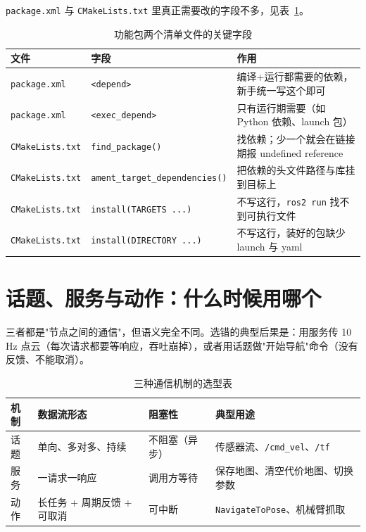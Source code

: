 \lstinline{package.xml} 与 \lstinline{CMakeLists.txt} 里真正需要改的字段不多，见表~\ref{tab:25-pkg}。

\begin{table}[htbp]
  \centering
  \caption{功能包两个清单文件的关键字段}\label{tab:25-pkg}
  \small
  \begin{tabular}{llp{6.4cm}}
    \toprule
    文件 & 字段 & 作用 \\
    \midrule
    \lstinline{package.xml} & \lstinline{<depend>} & 编译+运行都需要的依赖，新手统一写这个即可 \\
    \lstinline{package.xml} & \lstinline{<exec_depend>} & 只有运行期需要（如 Python 依赖、launch 包） \\
    \lstinline{CMakeLists.txt} & \lstinline{find_package()} & 找依赖；少一个就会在链接期报 undefined reference \\
    \lstinline{CMakeLists.txt} & \lstinline{ament_target_dependencies()} & 把依赖的头文件路径与库挂到目标上 \\
    \lstinline{CMakeLists.txt} & \lstinline{install(TARGETS ...)} & 不写这行，\lstinline{ros2 run} 找不到可执行文件 \\
    \lstinline{CMakeLists.txt} & \lstinline{install(DIRECTORY ...)} & 不写这行，装好的包缺少 launch 与 yaml \\
    \bottomrule
  \end{tabular}
\end{table}

\section{话题、服务与动作：什么时候用哪个}\label{sec:25-comm}

三者都是"节点之间的通信"，但语义完全不同。选错的典型后果是：用服务传 10 Hz 点云（每次请求都要等响应，吞吐崩掉），或者用话题做"开始导航"命令（没有反馈、不能取消）。

\begin{table}[htbp]
  \centering
  \caption{三种通信机制的选型表}\label{tab:25-comm}
  \small
  \begin{tabular}{lp{3.4cm}p{2.6cm}p{3.2cm}}
    \toprule
    机制 & 数据流形态 & 阻塞性 & 典型用途 \\
    \midrule
    话题 & 单向、多对多、持续 & 不阻塞（异步） & 传感器流、\lstinline{/cmd_vel}、\lstinline{/tf} \\
    服务 & 一请求一响应 & 调用方等待 & 保存地图、清空代价地图、切换参数 \\
    动作 & 长任务 + 周期反馈 + 可取消 & 可中断 & \lstinline{NavigateToPose}、机械臂抓取 \\
    \bottomrule
  \end{tabular}
\end{table}

